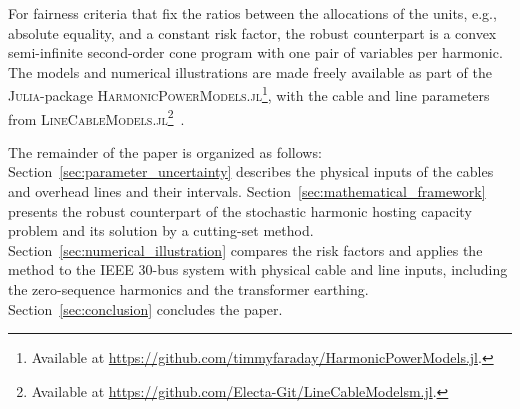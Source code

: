 For fairness criteria that fix the ratios between the allocations of the units, e.g., absolute equality, and a constant risk factor, the robust counterpart is a convex semi-infinite second-order cone program with one pair of variables per harmonic. The models and numerical illustrations are made freely available as part of the \textsc{Julia}-package \textsc{HarmonicPowerModels.jl}\footnote{Available at \url{https://github.com/timmyfaraday/HarmonicPowerModels.jl}.}, with the cable and line parameters from \textsc{LineCableModels.jl}\footnote{Available at \url{https://github.com/Electa-Git/LineCableModelsm.jl}.}~\cite{lcm_2026}.

The remainder of the paper is organized as follows: Section~\ref{sec:parameter_uncertainty} describes the physical inputs of the cables and overhead lines and their intervals. Section~\ref{sec:mathematical_framework} presents the robust counterpart of the stochastic harmonic hosting capacity problem and its solution by a cutting-set method. Section~\ref{sec:numerical_illustration} compares the risk factors and applies the method to the IEEE 30-bus system with physical cable and line inputs, including the zero-sequence harmonics and the transformer earthing. Section~\ref{sec:conclusion} concludes the paper.
